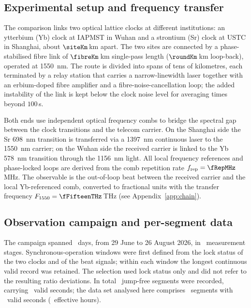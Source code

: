 \subsection*{Experimental setup and frequency transfer}

The comparison links two optical lattice clocks at different institutions:
an ytterbium (Yb) clock at IAPMST in Wuhan and a strontium (Sr) clock at
USTC in Shanghai, about $\siteKm$\,km apart. The two sites are connected by
a phase-stabilised fibre link of $\fibreKm$\,km single-pass length
($\roundKm$\,km loop-back), operated at \qty{1550}{nm}. The route is
divided into spans of tens of kilometres, each terminated by a relay
station that carries a narrow-linewidth laser together with an
erbium-doped fibre amplifier and a fibre-noise-cancellation loop; the
added instability of the link is kept below the clock noise level for
averaging times beyond $100$\,s.

Both ends use independent optical frequency combs to bridge the
spectral gap between the clock transitions and the telecom carrier. On the
Shanghai side the Sr \qty{698}{nm} transition is transferred via a
\qty{1397}{nm} continuous laser to the \qty{1550}{nm} carrier; on the
Wuhan side the received carrier is linked to the Yb \qty{578}{nm}
transition through the \qty{1156}{nm} light. All local frequency
references and phase-locked loops are derived from the comb repetition
rate $f_{\mathrm{rep}} = \fRepMHz$\,MHz. The observable is the
out-of-loop beat between the received carrier and the local
Yb-referenced comb, converted to fractional units with the transfer
frequency $F_{1550} = \fFifteenTHz$\,THz (see Appendix~\ref{app:chain}).

\subsection*{Observation campaign and per-segment data}

The campaign spanned \nDays~days, from 29 June to 26 August 2026, in
\nStages~measurement stages. Synchronous-operation windows were first
defined from the lock status of the two clocks and of the beat signals;
within each window the longest continuous valid record was retained.
The selection used lock status only and did not refer to the resulting
ratio deviations. In total \nSegAll~jump-free segments were recorded,
carrying \nSamplesAll~valid seconds; the data set analysed here
comprises \nSeg~segments with \nSamples~valid seconds
(\nHours~effective hours).

